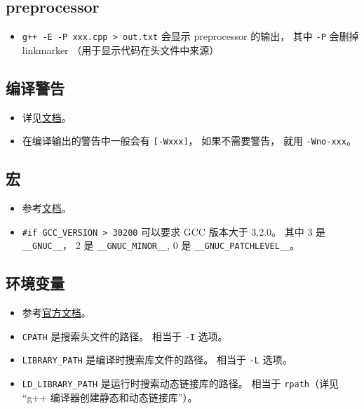 \subsection{preprocessor}
\begin{itemize}
\item \verb|g++ -E -P xxx.cpp > out.txt| 会显示 preprocessor 的输出， 其中 \verb|-P| 会删掉 linkmarker （用于显示代码在头文件中来源）
\end{itemize}

\subsection{编译警告}
\begin{itemize}
\item 详见\href{https://gcc.gnu.org/onlinedocs/gcc/Warning-Options.html}{文档}。
\item 在编译输出的警告中一般会有 \verb|[-Wxxx]|， 如果不需要警告， 就用 \verb|-Wno-xxx|。
\end{itemize}

\subsection{宏}
\begin{itemize}
\item 参考\href{https://gcc.gnu.org/onlinedocs/cpp/Common-Predefined-Macros.html}{文档}。
\item \verb|#if GCC_VERSION > 30200| 可以要求 GCC 版本大于 3.2.0。 其中 3 是 \verb|__GNUC__|， 2 是 \verb|__GNUC_MINOR__|,  0 是 \verb|__GNUC_PATCHLEVEL__|。
\end{itemize}

\subsection{环境变量}
\begin{itemize}
\item 参考\href{https://gcc.gnu.org/onlinedocs/gcc/Environment-Variables.html}{官方文档}。
\item \verb|CPATH| 是搜索头文件的路径。 相当于 \verb|-I| 选项。
\item \verb|LIBRARY_PATH| 是编译时搜索库文件的路径。 相当于 \verb|-L| 选项。
\item \verb|LD_LIBRARY_PATH| 是运行时搜索动态链接库的路径。 相当于 \verb|rpath|（详见 “g++ 编译器创建静态和动态链接库”）。
\end{itemize}

